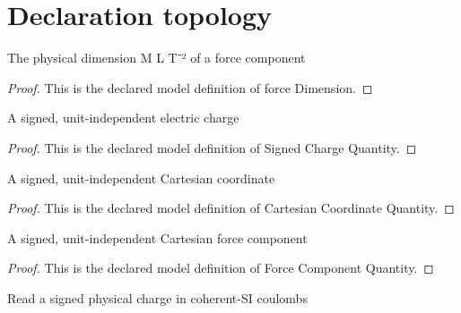 \section{Declaration topology}
\begin{definition}
  \label{def:physics:phyx-mini-0899:phyxminiproblems-problemphyxmini0899-forcedimension}
  The physical dimension M L T⁻² of a force component
\end{definition}
\begin{proof}
  This is the declared model definition of force Dimension.
\end{proof}
\begin{definition}
  \label{def:physics:phyx-mini-0899:phyxminiproblems-problemphyxmini0899-signedchargequantity}
  A signed, unit-independent electric charge
\end{definition}
\begin{proof}
  This is the declared model definition of Signed Charge Quantity.
\end{proof}
\begin{definition}
  \label{def:physics:phyx-mini-0899:phyxminiproblems-problemphyxmini0899-cartesiancoordinatequantity}
  A signed, unit-independent Cartesian coordinate
\end{definition}
\begin{proof}
  This is the declared model definition of Cartesian Coordinate Quantity.
\end{proof}
\begin{definition}
  \label{def:physics:phyx-mini-0899:phyxminiproblems-problemphyxmini0899-forcecomponentquantity}
  A signed, unit-independent Cartesian force component
\end{definition}
\begin{proof}
  This is the declared model definition of Force Component Quantity.
\end{proof}
\begin{definition}
  \label{def:physics:phyx-mini-0899:phyxminiproblems-problemphyxmini0899-chargeincoulombs}
  Read a signed physical charge in coherent-SI coulombs
\end{definition}
